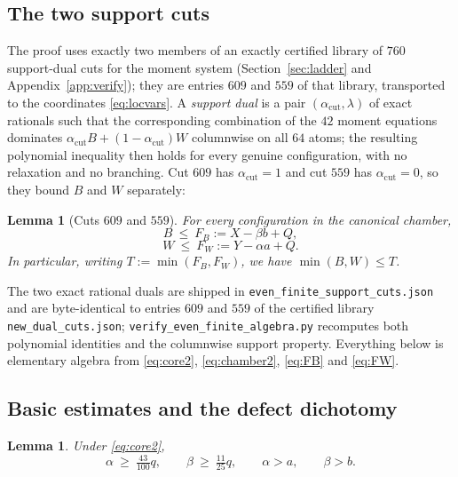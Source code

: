 \documentclass[11pt]{amsart}
\newtheorem{lemma}[theorem]{Lemma}
\theoremstyle{definition}
\theoremstyle{remark}
\newcommand{\bs}{\discretionary{}{}{}}
\begin{document}
\subsection{The two support cuts}

The proof uses exactly two members of an exactly certified library of $760$ support-dual cuts for the moment system (Section~\ref{sec:ladder} and Appendix~\ref{app:verify}); they are entries $609$ and $559$ of that library, transported to the coordinates \eqref{eq:locvars}. A \emph{support dual} is a pair $(\alpha_{\mathrm{cut}},\lambda)$ of exact rationals such that the corresponding combination of the $42$ moment equations dominates $\alpha_{\mathrm{cut}}B+(1-\alpha_{\mathrm{cut}})W$ columnwise on all $64$ atoms; the resulting polynomial inequality then holds for every genuine configuration, with no relaxation and no branching. Cut $609$ has $\alpha_{\mathrm{cut}}=1$ and cut $559$ has $\alpha_{\mathrm{cut}}=0$, so they bound $B$ and $W$ separately:

\begin{lemma}[Cuts $609$ and $559$]\label{lem:cuts}
For every configuration in the canonical chamber,
\begin{equation}\label{eq:FB}
B\ \le\ F_B:=X-\beta b+Q,
\end{equation}
\begin{equation}\label{eq:FW}
W\ \le\ F_W:=Y-\alpha a+Q .
\end{equation}
In particular, writing $T:=\min(F_B,F_W)$, we have $\min(B,W)\le T$.
\end{lemma}

The two exact rational duals are shipped in \texttt{even\_\bs{}finite\_\bs{}support\_\bs{}cuts.json} and are byte-identical to entries $609$ and $559$ of the certified library \texttt{new\_\bs{}dual\_\bs{}cuts.json}; \texttt{verify\_\bs{}even\_\bs{}finite\_\bs{}algebra.py} recomputes both polynomial identities and the columnwise support property. Everything below is elementary algebra from \eqref{eq:core2}, \eqref{eq:chamber2}, \eqref{eq:FB} and \eqref{eq:FW}.

\subsection{Basic estimates and the defect dichotomy}

\begin{lemma}\label{lem:basic}
Under \eqref{eq:core2},
\begin{equation}\label{eq:albe}
\alpha\ \ge\ \tfrac{43}{100}q,\qquad \beta\ \ge\ \tfrac{11}{25}q,\qquad \alpha>a,\qquad\beta>b .
\end{equation}
\end{lemma}
\end{document}
